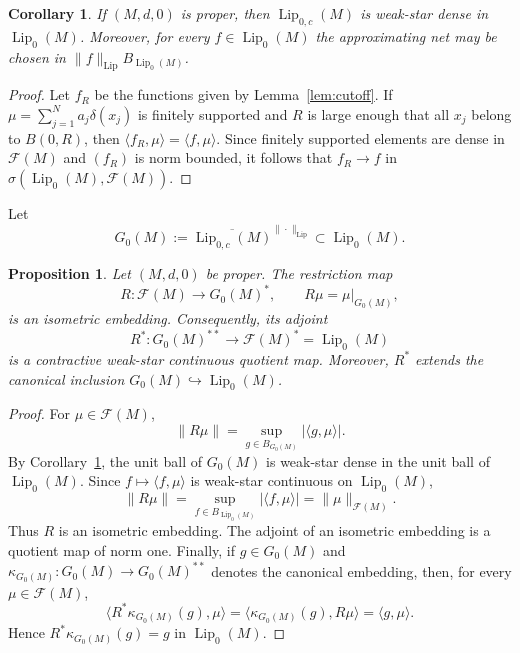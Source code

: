 \documentclass[11pt]{amsart}
\theoremstyle{plain}
\newtheorem{proposition}[theorem]{Proposition}
\newtheorem{corollary}[theorem]{Corollary}
\theoremstyle{definition}
\theoremstyle{remark}
\newcommand{\Lip}{\operatorname{Lip}}
\newcommand{\F}{\mathcal F}
\begin{document}
\begin{corollary}\label{cor:compact-density}
If $(M,d,0)$ is proper, then $\Lip_{0,c}(M)$ is weak-star dense in
$\Lip_0(M)$. Moreover, for every $f\in\Lip_0(M)$ the approximating net may
be chosen in $\|f\|_{\Lip}B_{\Lip_0(M)}$.
\end{corollary}

\begin{proof}
Let $f_R$ be the functions given by Lemma~\ref{lem:cutoff}. If
$\mu=\sum_{j=1}^N a_j\delta(x_j)$ is finitely supported and $R$ is large
enough that all $x_j$ belong to $B(0,R)$, then
$\langle f_R,\mu\rangle=\langle f,\mu\rangle$. Since finitely supported
elements are dense in $\F(M)$ and $(f_R)$ is norm bounded, it follows that
$f_R\to f$ in $\sigma(\Lip_0(M),\F(M))$.
\end{proof}

Let
\[
        G_0(M):=\overline{\Lip_{0,c}(M)}^{\|\cdot\|_{\Lip}}
        \subset \Lip_0(M).
\]

\begin{proposition}\label{prop:G0-quotient}
Let $(M,d,0)$ be proper. The restriction map
\[
        R:\F(M)\longrightarrow G_0(M)^*,
        \qquad R\mu=\mu|_{G_0(M)},
\]
is an isometric embedding. Consequently, its adjoint
\[
        R^*:G_0(M)^{**}\longrightarrow \F(M)^*=\Lip_0(M)
\]
is a contractive weak-star continuous quotient map. Moreover, $R^*$ extends
the canonical inclusion $G_0(M)\hookrightarrow \Lip_0(M)$.
\end{proposition}

\begin{proof}
For $\mu\in\F(M)$,
\[
        \|R\mu\|=\sup_{g\in B_{G_0(M)}}|\langle g,\mu\rangle|.
\]
By Corollary~\ref{cor:compact-density}, the unit ball of $G_0(M)$ is
weak-star dense in the unit ball of $\Lip_0(M)$. Since
$f\mapsto \langle f,\mu\rangle$ is weak-star continuous on $\Lip_0(M)$,
\[
        \|R\mu\|=\sup_{f\in B_{\Lip_0(M)}}|\langle f,\mu\rangle|
        =\|\mu\|_{\F(M)}.
\]
Thus $R$ is an isometric embedding. The adjoint of an isometric embedding is
a quotient map of norm one. Finally, if $g\in G_0(M)$ and
$\kappa_{G_0(M)}:G_0(M)\to G_0(M)^{**}$ denotes the canonical embedding,
then, for every $\mu\in\F(M)$,
\[
        \langle R^*\kappa_{G_0(M)}(g),\mu\rangle
        =\langle \kappa_{G_0(M)}(g),R\mu\rangle
        =\langle g,\mu\rangle.
\]
Hence $R^*\kappa_{G_0(M)}(g)=g$ in $\Lip_0(M)$.
\end{proof}
\end{document}

